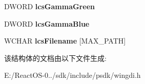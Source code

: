 \begin{DoxyCompactItemize}
\mbox{\label{structtag_l_o_g_c_o_l_o_r_s_p_a_c_e_w_a7c6050d17e0ddce72c63feb49557765a}} 
D\+W\+O\+RD {\bfseries lcs\+Gamma\+Green}
\item 
\mbox{\label{structtag_l_o_g_c_o_l_o_r_s_p_a_c_e_w_a0c897143f171eb2b171750d74aa857db}} 
D\+W\+O\+RD {\bfseries lcs\+Gamma\+Blue}
\item 
\mbox{\label{structtag_l_o_g_c_o_l_o_r_s_p_a_c_e_w_a98f5f1e7dfed1413fe21a8241555f6db}} 
W\+C\+H\+AR {\bfseries lcs\+Filename} \mbox{[}M\+A\+X\+\_\+\+P\+A\+TH\mbox{]}
\end{DoxyCompactItemize}


该结构体的文档由以下文件生成\+:\begin{DoxyCompactItemize}
\item 
E\+:/\+React\+O\+S-\/0../sdk/include/psdk/wingdi.\+h\end{DoxyCompactItemize}
